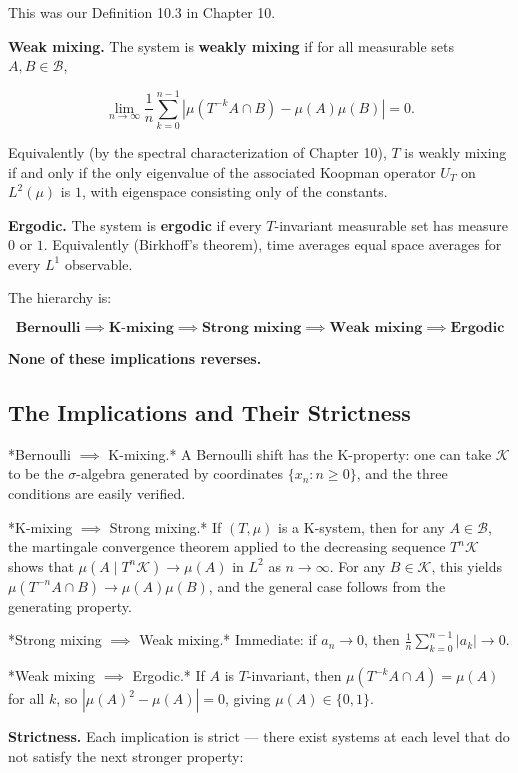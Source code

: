 This was our Definition 10.3 in Chapter 10.

\textbf{Weak mixing.} The system is \textbf{weakly mixing} if for all measurable sets $A, B \in \mathcal{B}$,

\[
\lim_{n \to \infty} \frac{1}{n}\sum_{k=0}^{n-1} \left|\mu(T^{-k}A \cap B) - \mu(A)\mu(B)\right| = 0.
\]

Equivalently (by the spectral characterization of Chapter 10), $T$ is weakly mixing if and only if the only eigenvalue of the associated Koopman operator $U_T$ on $L^2(\mu)$ is $1$, with eigenspace consisting only of the constants.

\textbf{Ergodic.} The system is \textbf{ergodic} if every $T$-invariant measurable set has measure $0$ or $1$. Equivalently (Birkhoff's theorem), time averages equal space averages for every $L^1$ observable.

The hierarchy is:

\[
\textbf{Bernoulli} \implies \textbf{K-mixing} \implies \textbf{Strong mixing} \implies \textbf{Weak mixing} \implies \textbf{Ergodic}
\]

\textbf{None of these implications reverses.}


\subsection{The Implications and Their Strictness}\label{sec:12.4.2}

*Bernoulli $\implies$ K-mixing.* A Bernoulli shift has the K-property: one can take $\mathcal{K}$ to be the $\sigma$-algebra generated by coordinates $\{x_n : n \geq 0\}$, and the three conditions are easily verified.

*K-mixing $\implies$ Strong mixing.* If $(T, \mu)$ is a K-system, then for any $A \in \mathcal{B}$, the martingale convergence theorem applied to the decreasing sequence $T^n \mathcal{K}$ shows that $\mu(A \mid T^n \mathcal{K}) \to \mu(A)$ in $L^2$ as $n \to \infty$. For any $B \in \mathcal{K}$, this yields $\mu(T^{-n}A \cap B) \to \mu(A)\mu(B)$, and the general case follows from the generating property.

*Strong mixing $\implies$ Weak mixing.* Immediate: if $a_n \to 0$, then $\frac{1}{n}\sum_{k=0}^{n-1}|a_k| \to 0$.

*Weak mixing $\implies$ Ergodic.* If $A$ is $T$-invariant, then $\mu(T^{-k}A \cap A) = \mu(A)$ for all $k$, so $|\mu(A)^2 - \mu(A)| = 0$, giving $\mu(A) \in \{0, 1\}$.

\textbf{Strictness.} Each implication is strict --- there exist systems at each level that do not satisfy the next stronger property:


